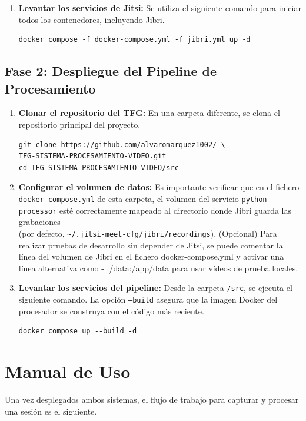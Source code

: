 \begin{enumerate}
    \item \textbf{Levantar los servicios de Jitsi:} Se utiliza el siguiente comando para iniciar todos los contenedores, incluyendo Jibri.
    \begin{verbatim}
docker compose -f docker-compose.yml -f jibri.yml up -d
    \end{verbatim}
\end{enumerate}

\subsection{Fase 2: Despliegue del Pipeline de Procesamiento}
\begin{enumerate}
    \item \textbf{Clonar el repositorio del TFG:} En una carpeta diferente, se clona el repositorio principal del proyecto.
    \begin{verbatim}
git clone https://github.com/alvaromarquez1002/ \ 
TFG-SISTEMA-PROCESAMIENTO-VIDEO.git
cd TFG-SISTEMA-PROCESAMIENTO-VIDEO/src
    \end{verbatim}
    
    \item \textbf{Configurar el volumen de datos:} Es importante verificar que en el fichero \texttt{docker-compose.yml} de esta carpeta, el volumen del servicio \texttt{python-processor} esté correctamente mapeado al directorio donde Jibri guarda las grabaciones \\ (por defecto, \texttt{\textasciitilde{}/.jitsi-meet-cfg/jibri/recordings}).
    (Opcional) Para realizar pruebas de desarrollo sin depender de Jitsi, se puede comentar la línea del volumen de Jibri en el fichero docker-compose.yml y activar una línea alternativa como - ./data:/app/data para usar vídeos de prueba locales.

    \item \textbf{Levantar los servicios del pipeline:} Desde la carpeta \texttt{/src}, se ejecuta el siguiente comando. La opción \texttt{--build} asegura que la imagen Docker del procesador se construya con el código más reciente.
    \begin{verbatim}
docker compose up --build -d
    \end{verbatim}
\end{enumerate}

\section{Manual de Uso}
\label{sec:manual_uso}
Una vez desplegados ambos sistemas, el flujo de trabajo para capturar y procesar una sesión es el siguiente.

